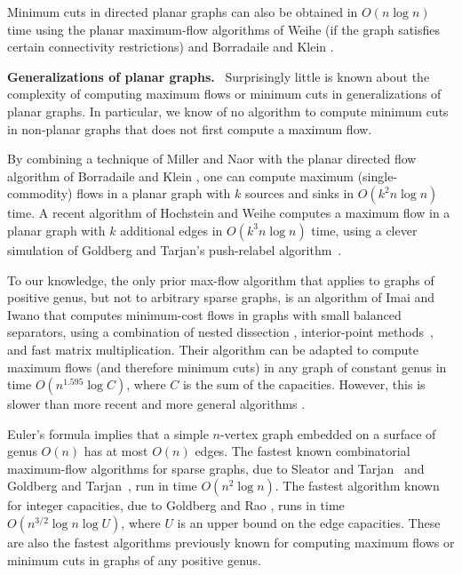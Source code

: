 \documentclass{sig-alternate}
\def\fakeparagraph#1{\medskip\noindent\textbf{#1}~}
\begin{document}
Minimum cuts in directed planar graphs can also be obtained in $O(n\log n)$ time using the planar maximum-flow algorithms of Weihe \cite{w-mstfp-97} (if the graph satisfies certain connectivity restrictions) and Borradaile and Klein \cite{b-epnfc-08, bk-tamfd-06, bk-amfdp-09}.

\fakeparagraph{Generalizations of planar graphs.}
Surprisingly little is known about the complexity of computing maximum flows or minimum cuts in generalizations of planar graphs.  In particular, we know of no algorithm to compute minimum cuts in non-planar graphs that does not first compute a maximum flow.

By combining a technique of Miller and Naor \cite{mn-fpgms-95} with the planar directed flow algorithm of Borradaile and Klein \cite{b-epnfc-08, bk-tamfd-06, bk-amfdp-09}, one can compute maximum (single-commodity) flows in a planar graph with $k$ sources and sinks in $O(k^2 n\log n)$ time.  A recent algorithm of Hochstein and Weihe \cite{hw-mstfkc-07} computes a maximum flow in a planar graph with $k$ additional edges in $O(k^3n\log n)$ time, using a clever simulation of Goldberg and Tarjan's push-relabel algorithm~\cite{gt-namfp-88}.

To our knowledge, the only prior max-flow algorithm that applies to graphs of positive genus, but not to arbitrary sparse graphs, is an algorithm of Imai and Iwano \cite{ii-espap-90} that computes minimum-cost flows in graphs with small balanced separators, using a combination of nested dissection \cite{lrt-gnd-79, pr-fepss-93}, interior-point methods~\cite{v-slpfm-89}, and fast matrix multiplication.  Their algorithm can be adapted to compute maximum flows (and therefore minimum cuts) in any graph of constant genus in time $O(n^{1.595}\log C)$, where $C$ is the sum of the capacities.  However, this is slower than more recent and more general algorithms \cite{gr-bfdb-98}.

Euler's formula implies that a simple $n$-vertex graph embedded on a surface of genus $O(n)$ has at most $O(n)$ edges.  The fastest known combinatorial maximum-flow algorithms for sparse graphs, due to Sleator and Tarjan~\cite{st-dsdt-83} and Goldberg and Tarjan~\cite{gt-namfp-88}, run in time $O(n^2\log n)$.  The fastest algorithm known for integer capacities, due to Goldberg and Rao \cite{gr-bfdb-98}, runs in time $O(n^{3/2}\log n\log U)$, where $U$ is an upper bound on the edge capacities.  These are also the fastest algorithms previously known for computing maximum flows or minimum cuts in graphs of any positive genus.
\end{document}
